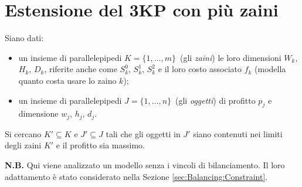 \section{Estensione del 3KP con più zaini}
\label{sec:extension1}

Siano dati:
\begin{itemize} 
	
	\item un insieme di parallelepipedi $K = \{1, \dots, m \}$\ 
	(gli \emph{zaini}) le loro dimensioni $W_k$, $H_k$, $D_k$, riferite
	anche come $S_k^0$, $S_k^1$, $S_k^2$ e il loro costo 
	associato $f_k$ (modella quanto costa usare lo zaino $k$);
	\item un insieme di parallelepipedi $J = \{1, \dots, n\}$\ 
	(gli \emph{oggetti}) di profitto $p_j$ e dimensione $w_j$, $h_j$, $d_j$.
\end{itemize}

Si cercano $K' \subseteq K$ e $J' \subseteq J$ tali che gli oggetti in $J'$ 
siano contenuti nei limiti degli zaini $K'$ e il profitto sia massimo.


\textbf{N.B.} Qui viene analizzato un modello senza i vincoli di 
bilanciamento.
Il loro adattamento è stato considerato nella Sezione 
\ref{sec:Balancing:Constraint}.


